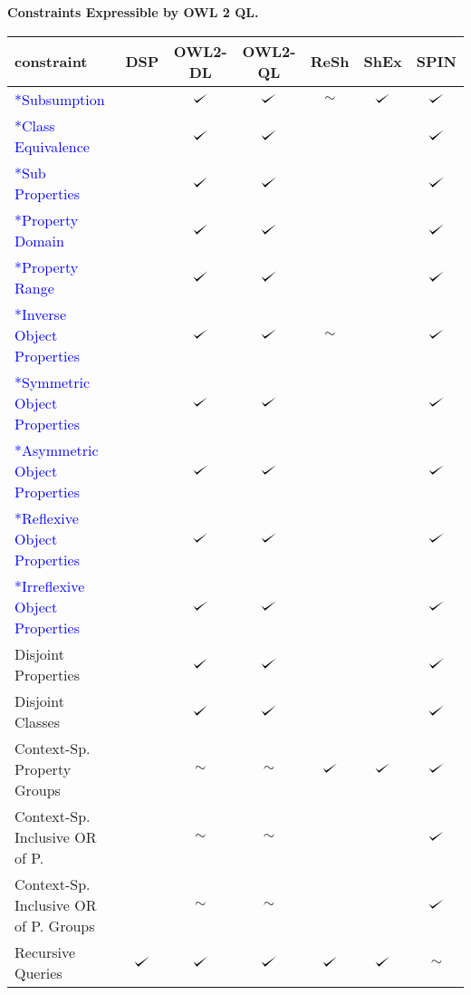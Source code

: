 \documentclass{llncs}
\def\checkmark{\tikz\fill[scale=0.4](0,.35) -- (.25,0) -- (1,.7) -- (.25,.15) -- cycle;}
\newenvironment{evaluation}{
  \scriptsize
  \sffamily
  \vspace{0.3cm}
  \begin{tabular}{l|c|c|c|c|c|c}
  \hline
  \textbf{constraint} & \textbf{DSP} & \textbf{OWL2-DL} & \textbf{OWL2-QL} & \textbf{ReSh} & \textbf{ShEx} & \textbf{SPIN} \\
  \hline

}{
  \hline
  \end{tabular}
  \linebreak
}
\begin{document}
\textbf{Constraints Expressible by OWL 2 QL.}

\begin{evaluation}
\textcolor{blue}{*Subsumption} & \ding{55} & $\checkmark$ & $\checkmark$ & $\sim$ & $\checkmark$ & $\checkmark$ \\
\textcolor{blue}{*Class Equivalence} & \ding{55} & $\checkmark$ & $\checkmark$ & \ding{55} & \ding{55} & $\checkmark$ \\
\textcolor{blue}{*Sub Properties} & \ding{55} & $\checkmark$ & $\checkmark$ & \ding{55} & \ding{55} & $\checkmark$ \\
\textcolor{blue}{*Property Domain} & \ding{55} & $\checkmark$ & $\checkmark$ & \ding{55} & \ding{55} & $\checkmark$ \\
\textcolor{blue}{*Property Range} & \ding{55} & $\checkmark$ & $\checkmark$ & \ding{55} & \ding{55} & $\checkmark$ \\
\textcolor{blue}{*Inverse Object Properties} & \ding{55} & $\checkmark$ & $\checkmark$ & $\sim$ & \ding{55} & $\checkmark$ \\
\textcolor{blue}{*Symmetric Object Properties} & \ding{55} & $\checkmark$ & $\checkmark$ & \ding{55} & \ding{55} & $\checkmark$ \\
\textcolor{blue}{*Asymmetric Object Properties} & \ding{55} & $\checkmark$ & $\checkmark$ & \ding{55} & \ding{55} & $\checkmark$ \\
\textcolor{blue}{*Reflexive Object Properties} & \ding{55} & $\checkmark$ & $\checkmark$ & \ding{55} & \ding{55} & $\checkmark$ \\
\textcolor{blue}{*Irreflexive Object Properties} & \ding{55} & $\checkmark$ & $\checkmark$ & \ding{55} & \ding{55} & $\checkmark$ \\
Disjoint Properties & \ding{55} & $\checkmark$ & $\checkmark$ & \ding{55} & \ding{55} & $\checkmark$ \\
Disjoint Classes & \ding{55} & $\checkmark$ & $\checkmark$ & \ding{55} & \ding{55} & $\checkmark$ \\
Context-Sp. Property Groups & \ding{55} & $\sim$ & $\sim$ & $\checkmark$ & $\checkmark$ & $\checkmark$ \\
Context-Sp. Inclusive OR of P. & \ding{55} & $\sim$ & $\sim$ & & \ding{55} & $\checkmark$ \\
Context-Sp. Inclusive OR of P. Groups & \ding{55} & $\sim$ & $\sim$ & & \ding{55} & $\checkmark$ \\
Recursive Queries & $\checkmark$ & $\checkmark$ & $\checkmark$ & $\checkmark$ & $\checkmark$ & $\sim$ \\

\end{evaluation}
\end{document}
